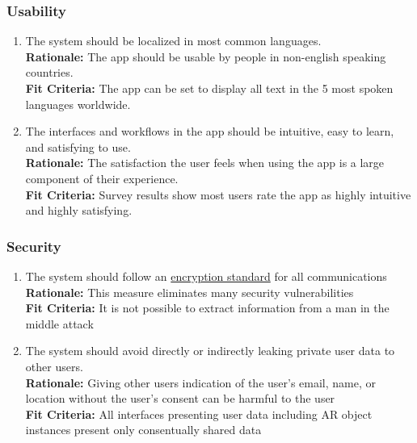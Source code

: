 \documentclass{article}
\begin{document}
\subsubsection{Usability}
\label{sub:usability}

\begin{enumerate}[align=left, label=\textbf{QS-U\arabic*.}]

    \item The system should be localized in most common languages. \\
          {\bf Rationale:} The app should be usable by people in non-english speaking countries. \\
          {\bf Fit Criteria:} The app can be set to display all text in the 5 most spoken languages worldwide. \\
    \item The interfaces and workflows in the app should be intuitive, easy to learn, and satisfying to use. \\
          {\bf Rationale:} The satisfaction the user feels when using the app is a large component of their experience. \\
          {\bf Fit Criteria:} Survey results show most users rate the app as highly intuitive and highly satisfying.
\end{enumerate}

\subsubsection{Security}
\label{sub:security}

\begin{enumerate}[align=left, label=\textbf{QS-SC\arabic*.}]

    \item The system should follow an \hyperref[def:encryption_standard]{encryption standard} for all communications \\
          {\bf Rationale:} This measure eliminates many security vulnerabilities \\
          {\bf Fit Criteria:} It is not possible to extract information from a man in the middle attack
    \item The system should avoid directly or indirectly leaking private user data to other users. \\
          {\bf Rationale:} Giving other users indication of the user's email, name, or location without the user's consent can be harmful to the user \\
          {\bf Fit Criteria:} All interfaces presenting user data including AR object instances present only consentually shared data
\end{enumerate}
\end{document}
